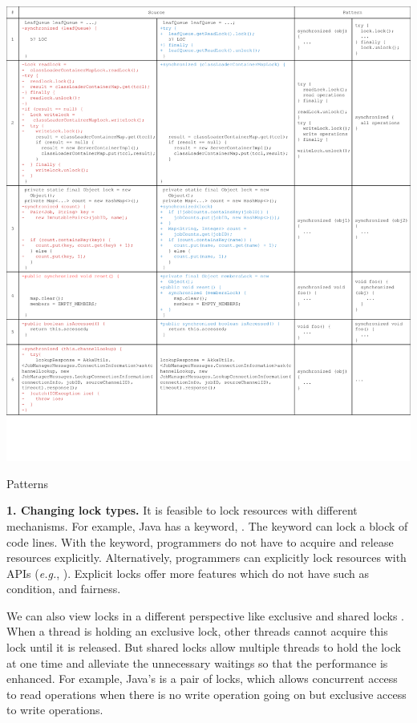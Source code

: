 \begin{table}
	\centering
	\includegraphics[width=1\textwidth]{patterns}
	\caption{Patterns}
	\label{table:patterns}
\end{table}

\noindent
\textbf{1. Changing lock types.} It is feasible to lock resources with different mechanisms. For example, Java has a keyword, . The keyword can lock a block of code lines. With the keyword, programmers do not have to acquire and release resources explicitly. Alternatively, programmers can explicitly lock resources with APIs (\emph{e.g.}, ). Explicit locks offer more features which  do not have such as condition,  and fairness.%

We can also view locks in a different perspective like exclusive and shared locks \cite{journals/jacm/KedemS83}. When a thread is holding an exclusive lock, other threads cannot acquire this lock until it is released. But shared locks allow multiple threads to hold the lock at one time and alleviate the unnecessary waitings so that the performance is enhanced. For example, Java's  is a pair of locks, which allows concurrent access to read operations when there is no write operation going on but exclusive access to write operations.%

